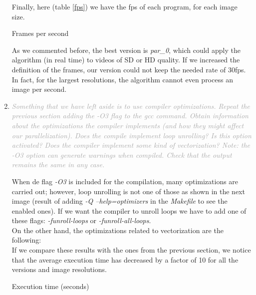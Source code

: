 \documentclass{article}
\newcommand{\greyItem}[1]{\item\emph{\textcolor{darkgray}{#1}}}
\begin{document}
\begin{enumerate}[label=5.\arabic*,leftmargin=*]
\pagebreak

Finally, here (table \ref{fps}) we have the fps of each program, for each image size.

\begin{table}[h]
    
    \centering
    \caption{Frames per second}
    \label{fps}
\end{table}

As we commented before, the best version is \emph{par\_0}, which could apply the algorithm (in real time) to videos of SD or HD quality. If we increased the definition of the frames, our version could not keep the needed rate of 30fps. In fact, for the largest resolutions, the algorithm cannot even process an image per second.

\pagebreak

\greyItem{Something that we have left aside is to use compiler optimizations. Repeat the previous section adding the -O3 flag to the gcc command. Obtain information about the optimizations the compiler implements (and how they might affect our parallelization). Does the compile implement loop unrolling? Is this option activated? Does the compiler implement some kind of vectorization? Note: the -O3 option can generate warnings when compiled. Check that the output remains the same in any case.}


When de flag \emph{-O3} is included for the compilation, many optimizations are carried out; however, loop unrolling is not one of those as shown in the next image (result of adding \emph{-Q --help=optimizers} in the \emph{Makefile} to see the enabled ones). If we want the compiler to unroll loops we have to add one of these flags: \emph{-funroll-loops} or \emph{-funroll-all-loops}.\\



On the other hand, the optimizations related to vectorization are the following:\\



If we compare these results with the ones from the previous section, we notice that the average execution time has decreased by a factor of 10 for all the versions and image resolutions.


\begin{table}[h]
    
    \centering
    \caption{Execution time (seconds)}
\end{table}


\end{enumerate}
\end{document}
